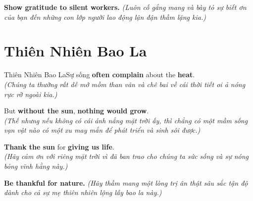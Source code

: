 \begin{baihoc}
  \textbf{Show gratitude to silent workers.} \textit{(Luôn cố gắng mang và bày tỏ sự biết ơn của bạn đến những con lớp người lao động lận đận thầm lặng kia.)}
\end{baihoc}

\vspace{0.8cm}

\ngayDay{}
\section{Thiên Nhiên Bao La}
\begin{truyen}{Thiên Nhiên Bao La}{Sự sống}
 \textbf{often complain} about the \textbf{heat}.\\
\textit{(Chúng ta thường rất dễ mở mồm than vãn và chê bai về cái thời tiết oi ả nóng rực rỡ ngoài kia.)}

But \textbf{without the sun}, \textbf{nothing would grow}.\\
\textit{(Thế nhưng nếu không có cái ánh nắng mặt trời ấy, thì chẳng có một mầm sống vạn vật nào có một xu may mắn để phát triển và sinh sôi được.)}

\textbf{Thank the sun} for \textbf{giving us life}.\\
\textit{(Hãy cảm ơn với riêng mặt trời vì đã ban trao cho chúng ta sức sống và sự nóng bỏng vĩnh hằng này.)}
\end{truyen}

\begin{baihoc}
  \textbf{Be thankful for nature.} \textit{(Hãy thầm mang một lòng trị ân thật sâu sắc tận độ dành cho cả sự mẹ thiên nhiên lộng lẫy bao la này.)}
\end{baihoc}

